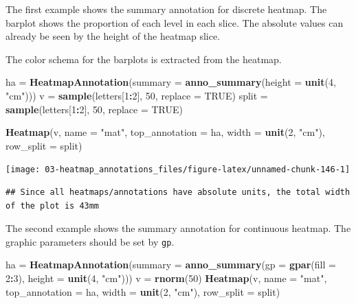 \documentclass[]{book}
\newenvironment{Shaded}{\begin{snugshade}}{\end{snugshade}}
\newcommand{\KeywordTok}[1]{\textcolor[rgb]{0.13,0.29,0.53}{\textbf{#1}}}
\newcommand{\DataTypeTok}[1]{\textcolor[rgb]{0.13,0.29,0.53}{#1}}
\newcommand{\DecValTok}[1]{\textcolor[rgb]{0.00,0.00,0.81}{#1}}
\newcommand{\StringTok}[1]{\textcolor[rgb]{0.31,0.60,0.02}{#1}}
\newcommand{\OtherTok}[1]{\textcolor[rgb]{0.56,0.35,0.01}{#1}}
\newcommand{\OperatorTok}[1]{\textcolor[rgb]{0.81,0.36,0.00}{\textbf{#1}}}
\newcommand{\NormalTok}[1]{#1}
\theoremstyle{definition}
\theoremstyle{definition}
\theoremstyle{definition}
\theoremstyle{remark}
\begin{document}
The first example shows the summary annotation for discrete heatmap. The
barplot shows the proportion of each level in each slice. The absolute
values can already be seen by the height of the heatmap slice.

The color schema for the barplots is extracted from the heatmap.

\begin{Shaded}
\begin{Highlighting}[]
\NormalTok{ha =}\StringTok{ }\KeywordTok{HeatmapAnnotation}\NormalTok{(}\DataTypeTok{summary =} \KeywordTok{anno_summary}\NormalTok{(}\DataTypeTok{height =} \KeywordTok{unit}\NormalTok{(}\DecValTok{4}\NormalTok{, }\StringTok{"cm"}\NormalTok{)))}
\NormalTok{v =}\StringTok{ }\KeywordTok{sample}\NormalTok{(letters[}\DecValTok{1}\OperatorTok{:}\DecValTok{2}\NormalTok{], }\DecValTok{50}\NormalTok{, }\DataTypeTok{replace =} \OtherTok{TRUE}\NormalTok{)}
\NormalTok{split =}\StringTok{ }\KeywordTok{sample}\NormalTok{(letters[}\DecValTok{1}\OperatorTok{:}\DecValTok{2}\NormalTok{], }\DecValTok{50}\NormalTok{, }\DataTypeTok{replace =} \OtherTok{TRUE}\NormalTok{)}

\KeywordTok{Heatmap}\NormalTok{(v, }\DataTypeTok{name =} \StringTok{"mat"}\NormalTok{, }\DataTypeTok{top_annotation =}\NormalTok{ ha, }\DataTypeTok{width =} \KeywordTok{unit}\NormalTok{(}\DecValTok{2}\NormalTok{, }\StringTok{"cm"}\NormalTok{), }
    \DataTypeTok{row_split =}\NormalTok{ split)}
\end{Highlighting}
\end{Shaded}

\begin{center}\texttt{[image: 03-heatmap\_annotations\_files/figure-latex/unnamed-chunk-146-1]} \end{center}

\begin{verbatim}
## Since all heatmaps/annotations have absolute units, the total width of the plot is 43mm
\end{verbatim}

The second example shows the summary annotation for continuous heatmap.
The graphic parameters should be set by \texttt{gp}.

\begin{Shaded}
\begin{Highlighting}[]
\NormalTok{ha =}\StringTok{ }\KeywordTok{HeatmapAnnotation}\NormalTok{(}\DataTypeTok{summary =} \KeywordTok{anno_summary}\NormalTok{(}\DataTypeTok{gp =} \KeywordTok{gpar}\NormalTok{(}\DataTypeTok{fill =} \DecValTok{2}\OperatorTok{:}\DecValTok{3}\NormalTok{), }
    \DataTypeTok{height =} \KeywordTok{unit}\NormalTok{(}\DecValTok{4}\NormalTok{, }\StringTok{"cm"}\NormalTok{)))}
\NormalTok{v =}\StringTok{ }\KeywordTok{rnorm}\NormalTok{(}\DecValTok{50}\NormalTok{)}
\KeywordTok{Heatmap}\NormalTok{(v, }\DataTypeTok{name =} \StringTok{"mat"}\NormalTok{, }\DataTypeTok{top_annotation =}\NormalTok{ ha, }\DataTypeTok{width =} \KeywordTok{unit}\NormalTok{(}\DecValTok{2}\NormalTok{, }\StringTok{"cm"}\NormalTok{), }
    \DataTypeTok{row_split =}\NormalTok{ split)}
\end{Highlighting}
\end{Shaded}
\end{document}
